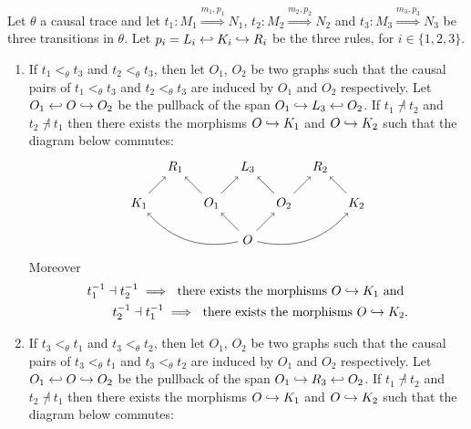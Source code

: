 \begin{lemma}
  \label{lem:constraint_mj}
  Let $\theta$ a causal trace and let $t_1:M_1\overset{m_1,p_1}{\Rightarrow}N_1$, $t_2:M_2\overset{m_2,p_2}{\Rightarrow}N_2$ and $t_3:M_3\overset{m_3,p_3}{\Rightarrow}N_3$ be three transitions in $\theta$. Let $p_i = L_i\hookleftarrow K_i \hookrightarrow R_i$ be the three rules, for $i\in\{1,2,3\}$.
  \begin{enumerate}
  \item
    \label{lem:constraint_meet}
    If $t_1<_{\theta} t_3$ and $t_2<_{\theta} t_3$, then let $O_1$, $O_2$ be two graphs such that the causal pairs of $t_1<_{\theta} t_3$ and $t_2<_{\theta} t_3$ are induced by $O_1$ and $O_2$ respectively.
Let $O_1\hookleftarrow O\hookrightarrow O_2$ be the pullback of the span $O_1\hookrightarrow L_3 \hookleftarrow O_2$. If $t_1\not\dashv t_2$ and $t_2\not\dashv t_1$ then there exists the morphisms $O\hookrightarrow K_1$ and $O\hookrightarrow K_2$ such that the diagram below commutes:
    \[
    \begin{tikzpicture} %
      \node (o) at (0,-1) {\(O\)};
      \node (r3) at (0,1) {\(L_3\)};
      \node (o1) at (-1,0) {\(O_1\)};
      \node (o2) at (1,0) {\(O_2\)};
      \node (r1) at (-2,1) {\(R_1\)};
      \node (r2) at (2,1) {\(R_2\)};
      \node (k1) at (-3,0) {\(K_1\)};
      \node (k2) at (3,0) {\(K_2\)};
      \draw [->] (o) -- (o1);
      \draw [->] (o) -- (o2);
      \draw [->] (o1) -- (r3);
      \draw [->] (o2) -- (r3);
      \draw [->] (o1) -- (r1);
      \draw [->] (o2) -- (r2);
      \draw [->] (k1) -- (r1);
      \draw [->] (k2) -- (r2);
      \draw [->] (o) to [bend left] (k1);
      \draw [->] (o) to [bend right] (k2);
    \end{tikzpicture}
    \]
    Moreover
    \begin{align*}
      t_1^{-1}\dashv t_2^{-1}\implies\text{ there exists the morphisms }O\hookrightarrow K_1\text{ and }\\
      t_2^{-1}\dashv t_1^{-1}\implies\text{ there exists the morphisms }O\hookrightarrow K_2.
    \end{align*}
  \item
    \label{lem:constraint_join}
    If $t_3 <_{\theta} t_1$ and $t_3<_{\theta} t_2$, then let $O_1$, $O_2$ be two graphs such that the causal pairs of $t_3 <_{\theta} t_1$ and $t_3<_{\theta} t_2$ are induced by $O_1$ and $O_2$ respectively.
Let $O_1\hookleftarrow O\hookrightarrow O_2$ be the pullback of the span $O_1\hookrightarrow R_3 \hookleftarrow O_2$. If $t_1\not\dashv t_2$ and $t_2\not\dashv t_1$
then there exists the morphisms $O\hookrightarrow K_1$ and $O\hookrightarrow K_2$ such that the diagram below commutes:

\end{enumerate}
\end{lemma}
